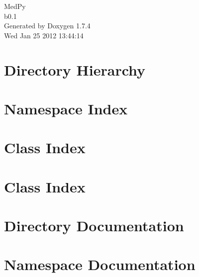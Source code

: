 \documentclass[a4paper]{book}
\begin{document}
\hypersetup{pageanchor=false}
\begin{titlepage}
\vspace*{7cm}
\begin{center}
{\Large MedPy \\[1ex]\large b0.1 }\\
\vspace*{1cm}
{\large Generated by Doxygen 1.7.4}\\
\vspace*{0.5cm}
{\small Wed Jan 25 2012 13:44:14}\\
\end{center}
\end{titlepage}
\clearemptydoublepage
{}
\tableofcontents
\clearemptydoublepage
{}
\hypersetup{pageanchor=true}
\chapter{Directory Hierarchy}

\chapter{Namespace Index}

\chapter{Class Index}

\chapter{Class Index}

\chapter{Directory Documentation}
















\chapter{Namespace Documentation}








\end{document}
